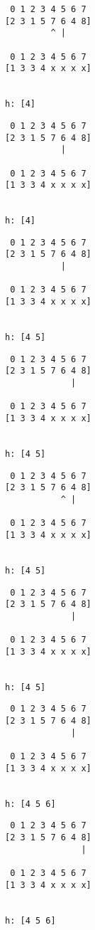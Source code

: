 { \begin{verbatim}
 0 1 2 3 4 5 6 7
[2 3 1 5 7 6 4 8]
         ^ |

 0 1 2 3 4 5 6 7
[1 3 3 4 x x x x]


h: [4]
\end{verbatim} }

{ \begin{verbatim}
 0 1 2 3 4 5 6 7
[2 3 1 5 7 6 4 8]
           |

 0 1 2 3 4 5 6 7
[1 3 3 4 x x x x]


h: [4]
\end{verbatim} }

{ \begin{verbatim}
 0 1 2 3 4 5 6 7
[2 3 1 5 7 6 4 8]
           |

 0 1 2 3 4 5 6 7
[1 3 3 4 x x x x]


h: [4 5]
\end{verbatim} }

{ \begin{verbatim}
 0 1 2 3 4 5 6 7
[2 3 1 5 7 6 4 8]
             |

 0 1 2 3 4 5 6 7
[1 3 3 4 x x x x]


h: [4 5]
\end{verbatim} }

{ \begin{verbatim}
 0 1 2 3 4 5 6 7
[2 3 1 5 7 6 4 8]
           ^ |

 0 1 2 3 4 5 6 7
[1 3 3 4 x x x x]


h: [4 5]
\end{verbatim} }

{ \begin{verbatim}
 0 1 2 3 4 5 6 7
[2 3 1 5 7 6 4 8]
             |

 0 1 2 3 4 5 6 7
[1 3 3 4 x x x x]


h: [4 5]
\end{verbatim} }

{ \begin{verbatim}
 0 1 2 3 4 5 6 7
[2 3 1 5 7 6 4 8]
             |

 0 1 2 3 4 5 6 7
[1 3 3 4 x x x x]


h: [4 5 6]
\end{verbatim} }

{ \begin{verbatim}
 0 1 2 3 4 5 6 7
[2 3 1 5 7 6 4 8]
               |

 0 1 2 3 4 5 6 7
[1 3 3 4 x x x x]


h: [4 5 6]
\end{verbatim} }

